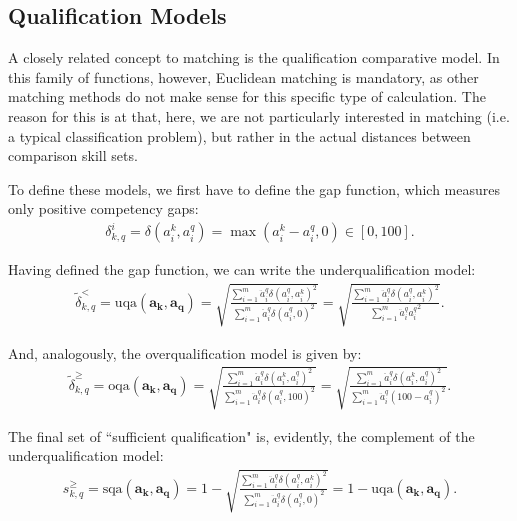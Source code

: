 \documentclass{elsarticle} %
\begin{document}
\subsection{Qualification Models}
A closely related concept to matching is the qualification comparative model.
In this family of functions, however, Euclidean matching is mandatory, as other
matching methods do not make sense for this specific type of calculation. The
reason for this is at that, here, we are not particularly interested in
matching (i.e. a typical classification problem), but rather in the actual
distances between comparison skill sets.

To define these models, we first have to define the gap function, which
measures only positive competency gaps:
\begin{gather}
    \delta_{k,q}^{i} =
    \delta(a_{i}^{k}, a_{i}^{q}) =
    \max(
    a_{i}^{k} - a_{i}^{q}
    , 0
    )
    \in [0, 100]
    .
\end{gather}

Having defined the gap function, we can write the underqualification model:
\begin{gather}
    \tilde{\delta}_{k,q}^{<} =
    \text{uqa}(\boldsymbol{a_k}, \boldsymbol{a_q}) =
    \sqrt{
    \frac{
    \sum_{i=1}^{m}{
    \ddot{a}_{i}^{q} {\delta(a_{i}^{q}, a_{i}^{k})} ^ 2
    }
    }{
    \sum_{i=1}^{m}{
    \ddot{a}_{i}^{q} {\delta(a_{i}^{q}, 0)} ^ 2
    }
    }
    } =
    \sqrt{
    \frac{
    \sum_{i=1}^{m}{
    \ddot{a}_{i}^{q} {\delta(a_{i}^{q}, a_{i}^{k})} ^ 2
    }
    }{
    \sum_{i=1}^{m}{
    \ddot{a}_{i}^{q} {a_{i}^{q}} ^ 2
    }
    }
    }
    .
\end{gather}

And, analogously, the overqualification model is given by:
\begin{gather}
    \tilde{\delta}_{k,q}^{\geq} =
    \text{oqa}(\boldsymbol{a_k}, \boldsymbol{a_q}) =
    \sqrt{
    \frac{
    \sum_{i=1}^{m}{
    \ddot{a}_{i}^{q} {\delta(a_{i}^{k}, a_{i}^{q})} ^ 2
    }
    }{
    \sum_{i=1}^{m}{
    \ddot{a}_{i}^{q} {\delta(a_{i}^{q}, 100)} ^ 2
    }
    }
    } =
    \sqrt{
    \frac{
    \sum_{i=1}^{m}{
    \ddot{a}_{i}^{q} {\delta(a_{i}^{k}, a_{i}^{q})} ^ 2
    }
    }{
    \sum_{i=1}^{m}{
    \ddot{a}_{i}^{q} {(100 - a_{i}^{q})} ^ 2
    }
    }
    }
    .
\end{gather}

The final set of ``sufficient qualification" is, evidently, the complement of
the underqualification model:
\begin{gather}
    s_{k,q}^{\geq} =
    \text{sqa}(\boldsymbol{a_k}, \boldsymbol{a_q}) =
    1 -
    \sqrt{
    \frac{
    \sum_{i=1}^{m}{
    \ddot{a}_{i}^{q} {\delta(a_{i}^{q}, a_{i}^{k})} ^ 2
    }
    }{
    \sum_{i=1}^{m}{
    \ddot{a}_{i}^{q} {\delta(a_{i}^{q}, 0)} ^ 2
    }
    }
    } =
    1 - \text{uqa}(\boldsymbol{a_k}, \boldsymbol{a_q})
    .
\end{gather}
\end{document}

